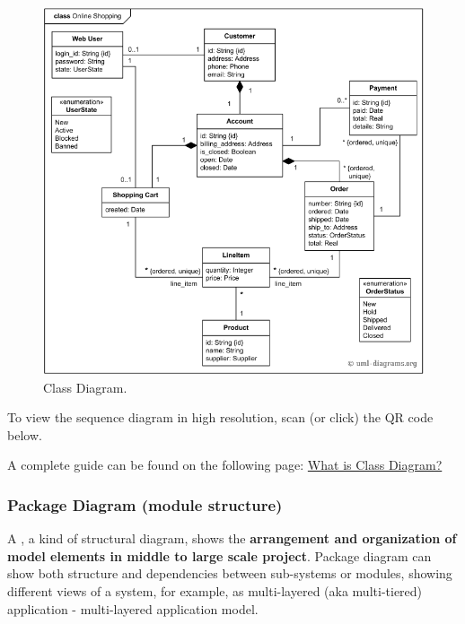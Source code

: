 \begin{figure}[!htp]
    \centering
    \includegraphics[width=\textwidth]{img/class-diagram.png}
    \caption{Class Diagram.}
\end{figure}

\noindent
To view the sequence diagram in high resolution, scan (or click) the QR code below.
\begin{center}
\end{center}
A complete guide can be found on the following page: \href{https://www.visual-paradigm.com/guide/uml-unified-modeling-language/what-is-class-diagram/}{What is Class Diagram?
}

\newpage

\subsubsection{Package Diagram (module structure)}

A , a kind of structural diagram, shows the \textbf{arrangement and organization of model elements in middle to large scale project}. Package diagram can show both structure and dependencies between sub-systems or modules, showing different views of a system, for example, as multi-layered (aka multi-tiered) application - multi-layered application model.

